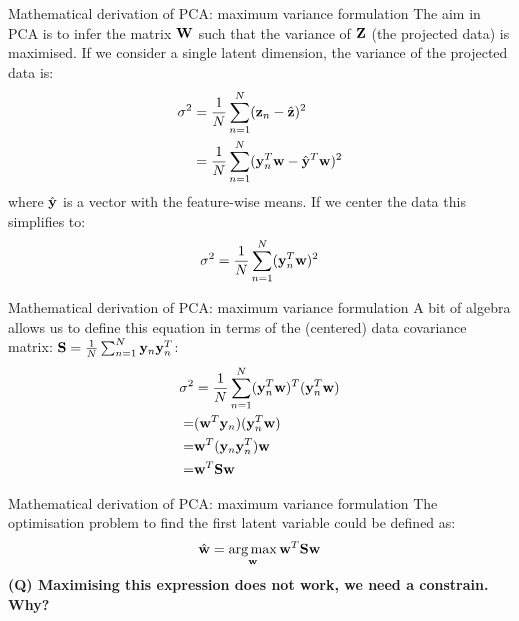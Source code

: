 \documentclass[aspectratio=169,notes]{beamer}
\begin{document}

	\begin{frame}{Mathematical derivation of PCA: maximum variance formulation}
	The aim in PCA is to infer the matrix ${\bf W}$ such that the variance of ${\bf Z}$ (the projected data) is maximised. If we consider a single latent dimension, the variance of the projected data is:
	\begin{align*}
		\sigma^2 &= \frac{1}{N}\sum_{n=1}^{N} ({\bf z}_n - \hat{{\bf z}})^{2} \\
				 &= \frac{1}{N}\sum_{n=1}^{N} ({\bf y}_n^T {\bf w} - \hat{{\bf y}}^T{\bf w})^{2}
	\end{align*}
	where $\hat{{\bf y}}$ is a vector with the feature-wise means. If we center the data this simplifies to:
	\begin{equation*}
		\sigma^2 = \frac{1}{N}\sum_{n=1}^{N} ({\bf y}_n^T {\bf w})^{2}
	\end{equation*}
	\end{frame}

	\begin{frame}{Mathematical derivation of PCA: maximum variance formulation}
	A bit of algebra allows us to define this equation in terms of the (centered) data covariance matrix: ${\bf S} = \frac{1}{N}\sum_{n=1}^{N} {\bf y}_n{\bf y}_n^T$:
	\begin{align*}
		\sigma^2 &= \frac{1}{N}\sum_{n=1}^{N} ({\bf y}_n^T {\bf w})^T ({\bf y}_n^T {\bf w}) \\
		=& ({\bf w}^T {\bf y}_n) ({\bf y}_n^T {\bf w}) \\
		=& {\bf w}^T ({\bf y}_n {\bf y}_n^T) {\bf w} \\
		=& {\bf w}^T {\bf S} {\bf w}
	\end{align*}
	\end{frame}

	\begin{frame}{Mathematical derivation of PCA: maximum variance formulation}
	The optimisation problem to find the first latent variable could be defined as:
	\[
		\hat{{\bf w}} = \operatorname*{arg\,max}_{{\bf w}} {\bf w}^T {\bf S} {\bf w}
	\]
	\leavevmode\newline
	\textbf{(Q) Maximising this expression does not work, we need a constrain. Why?}
	\end{frame}
\end{document}
